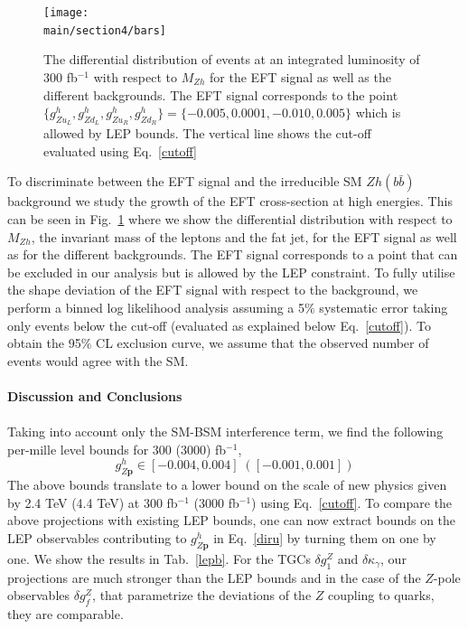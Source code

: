 \documentclass[../report.tex]{subfiles}
\providecommand{\main}{..}
\begin{document}
\begin{figure}[!t]
\texttt{[image: \\main/section4/bars]}
\caption{The differential distribution of events at an integrated luminosity of 300 fb$^{-1}$ with respect to $M_{Zh}$ for the EFT signal as well as the different backgrounds. The EFT signal corresponds to the point $\{{g}^h_{Zu_L} ,{g}^h_{Zd_L} ,{g}^h_{Zu_R} ,{g}^h_{Zd_R} \}=\{-0.005, 0.0001 , -0.010, 0.005 \}$ which is allowed by  LEP bounds. The vertical line shows the cut-off evaluated using Eq.~\ref{cutoff}}
\label{bars}
\end{figure}

To discriminate between the EFT signal and the irreducible SM $Zh(b\bar b)$ background we study  the 
growth of the EFT cross-section at high energies. This can be seen in Fig.~\ref{bars}  where we show the differential distribution with respect to $M_{Zh}$, the invariant mass of the leptons and the fat jet, for the EFT signal as well as for the different backgrounds. The EFT signal corresponds to a point that can be excluded in our analysis but is allowed by the LEP constraint.  To fully utilise the shape deviation of the EFT signal with respect to the background, 
we perform a binned log likelihood analysis assuming a 5$\%$ systematic error taking only events below the cut-off (evaluated as explained below Eq.~\ref{cutoff}). To obtain the   95$\%$ CL exclusion curve, we assume that 
the observed number of events would agree with the SM. \\ \\
\large{\bf Discussion and Conclusions} \\ \\
\normalsize
Taking into account only the SM-BSM interference term, we find the following per-mille level bounds for 300 (3000) fb$^{-1}$, 
\begin{equation}
g^h_{Z\textbf{p}} \in  \left[-0.004,0.004\right] \; (\left[-0.001,0.001\right])
\label{obo}
\end{equation}
The above bounds    translate to a lower bound on the scale of new physics given by 2.4 TeV (4.4 TeV) at 300 fb$^{-1}$ (3000 fb$^{-1}$) using Eq.~\ref{cutoff}.  To compare the above projections with existing LEP bounds, one can now extract bounds on the LEP observables contributing to $g^h_{Z\textbf{p}}$ in Eq.~\ref{diru} by turning them  on one by one. We show the results  in Tab.~\ref{lepb}. For the TGCs $\delta g^Z_1$ and $\delta \kappa_\gamma$, our projections are much stronger than the LEP bounds and  in the case of the $Z$-pole observables $\delta g^Z_f$, that parametrize the deviations of the $Z$ coupling to quarks, they are comparable. 
\end{document}
